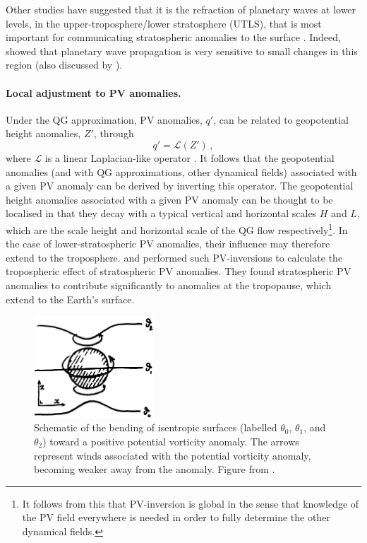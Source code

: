 Other studies have suggested that it is the refraction of planetary waves at
lower levels, in the upper-troposphere/lower stratosphere (UTLS), that is most
important for communicating stratospheric anomalies to the surface
\citep{Limpasuvan2000,Hartmann2000}. Indeed, \citet{Chen1992} showed that
planetary wave propagation is very sensitive to small changes in this region
(also discussed by \citet{Haynes2005}).

\paragraph{Local adjustment to PV anomalies.} Under the QG approximation, PV
anomalies, $q'$, can be related to geopotential height anomalies, $Z'$, through
\begin{equation}
  q' = \mathcal{L}(Z')\, ,
\end{equation}
where $\mathcal{L}$ is a linear Laplacian-like operator \citep{Charney1962}. It
follows that the geopotential anomalies (and with QG approximations, other
dynamical fields) associated with a given PV anomaly can be derived by inverting
this operator. The geopotential height anomalies associated with a given PV
anomaly can be thought to be localised in that they decay with a typical
vertical and horizontal scales $H$ and $L$, which are the scale height and
horizontal scale of the QG flow respectively\footnote{It follows from this that
  PV-inversion is global in the sense that knowledge of the PV field everywhere
  is needed in order to fully determine the other dynamical fields.}. In the
case of lower-stratospheric PV anomalies, their influence may therefore extend
to the troposphere. \citet{Hartley1998} and \citet{Black2002} performed such
PV-inversions to calculate the tropospheric effect of stratospheric PV
anomalies. They found stratospheric PV anomalies to contribute significantly to
anomalies at the tropopause, which extend to the Earth's surface.

\begin{figure}
  \centering
  \noindent\includegraphics[width=0.4\textwidth]{figures/chapter-intro/ambaum_hoskins.png}
  \caption[Schematic from \citet{Ambaum2002}]{Schematic of the bending of
    isentropic surfaces (labelled $\theta_0$, $\theta_1$, and $\theta_2$) toward
    a positive potential vorticity anomaly. The arrows represent winds
    associated with the potential vorticity anomaly, becoming weaker away from
    the anomaly. Figure from \citet{Ambaum2002}.}
  \label{fig:ambaum_hoskins}
\end{figure}


